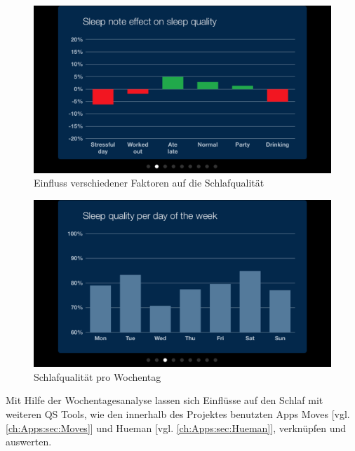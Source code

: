 \begin{figure}[]
	\centering
    \includegraphics[scale=0.5]{images/SleepCycle/SleepNoteEffectOnSleepQuality} 
    \caption{Einfluss verschiedener Faktoren auf die Schlafqualität \cite{fig:SCEffect}}
    \label{fig:SCEffect}
\end{figure}

\begin{figure}[]
    \centering
    \includegraphics[scale=0.5]{images/SleepCycle/SleepQualityPerDayOfWeek}  
    \caption{Schlafqualität pro Wochentag \cite{fig:SCQualityPerDay}}
    \label{fig:SCQualityPerDay}
\end{figure}

Mit Hilfe der Wochentagesanalyse lassen sich Einflüsse auf den Schlaf mit weiteren QS Tools, wie den innerhalb des Projektes benutzten Apps Moves [vgl. \ref{ch:Apps:sec:Moves}] und Hueman [vgl. \ref{ch:Apps:sec:Hueman}], verknüpfen und auswerten.


